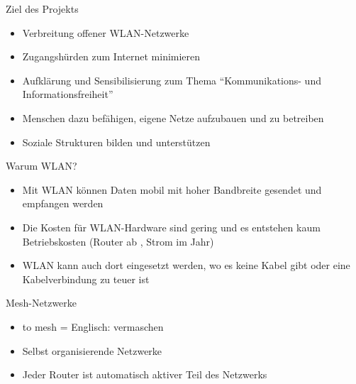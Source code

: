 \documentclass[c]{beamer}
\begin{document}
\begin{frame}{Ziel des Projekts}
	\begin{itemize}
		\item Verbreitung offener WLAN-Netzwerke
		\item Zugangshürden zum Internet minimieren
		\item Aufklärung und Sensibilisierung zum Thema ``Kommunikations- und Informationsfreiheit''
		\item Menschen dazu befähigen, eigene Netze aufzubauen und zu betreiben
		\item Soziale Strukturen bilden und unterstützen
	\end{itemize}
\end{frame}

\begin{frame}{Warum WLAN?}
	\begin{itemize}
		\item Mit WLAN können Daten mobil mit hoher Bandbreite gesendet und empfangen werden
		\item Die Kosten für WLAN-Hardware sind gering und es entstehen kaum Betriebskosten (Router ab , Strom  im Jahr)
		\item WLAN kann auch dort eingesetzt werden, wo es keine Kabel gibt oder eine Kabelverbindung zu teuer ist
	\end{itemize}
\end{frame}

\begin{frame}{Mesh-Netzwerke}
	\begin{itemize}
		\item to mesh = Englisch: vermaschen
		\item Selbst organisierende Netzwerke
		\item Jeder Router ist automatisch aktiver Teil des Netzwerks
	\end{itemize}
\end{frame}
\end{document}
